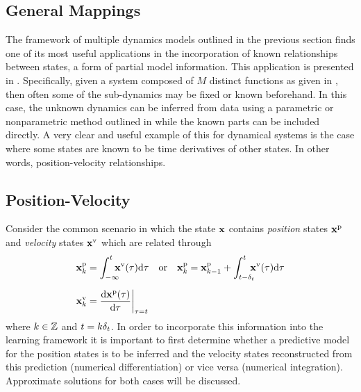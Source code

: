 \subsection{General Mappings}
The framework of multiple dynamics models outlined in the previous section finds one of its most useful applications in the incorporation of known relationships between states, a form of partial model information. This application is presented in \cite{HRM12}. Specifically, given a system composed of $M$ distinct functions as given in , then often some of the sub-dynamics may be fixed or known beforehand. In this case, the unknown dynamics can be inferred from data using a parametric or nonparametric method outlined in  while the known parts can be included directly. A very clear and useful example of this for dynamical systems is the case where some states are known to be time derivatives of other states. In other words, position-velocity relationships.









\subsection{Position-Velocity}
\label{sec:posvel}




Consider the common scenario in which the state $\mathbf{x}$ contains \textit{position} states $\mathbf{x}^{\text{p}}$ and \textit{velocity} states $\mathbf{x}^{\text{v}}$ which are related through
\begin{align}
\bxp_k &= \int_{-\infty}^t \!\!\!\!\bxv(\tau) \dd\tau \quad\text{or}\quad
\bxp_k = \bxp_{k-1} + \int_{t-\Dt}^t \!\!\!\!\bxv(\tau) \dd\tau \label{eqn:posint} \\[0.2cm]
\bxv_k &= \frac{\dd\bxp(\tau)}{\dd \tau} \bigg|_{\tau = t} \label{eqn:veldiff}
\end{align}
where $k \in \mathbb{Z}$ and $t = k\delta_t$. In order to incorporate this information into the learning framework it is important to first determine whether a predictive model for the position states is to be inferred and the velocity states reconstructed from this prediction (numerical differentiation) or vice versa (numerical integration). Approximate solutions for both cases will be discussed.



